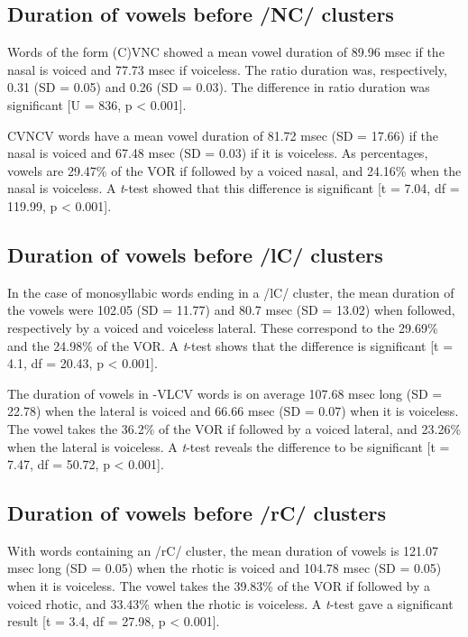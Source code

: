 \documentclass[11pt,a4paper,openany]{memoir}\usepackage[]{graphicx}\usepackage[]{color}
\begin{document}
\subsection{Duration of vowels before /NC/ clusters}


Words of the form (C)VNC showed a mean vowel duration of 89.96 msec if the nasal is voiced and 77.73 msec if voiceless.
The ratio duration was, respectively, 0.31 (SD = 0.05) and 0.26 (SD = 0.03).
The difference in ratio duration was significant [U = 836, p < 0.001].



CVNCV words have a mean vowel duration of 81.72 msec (SD = 17.66) if the nasal is voiced and 67.48 msec  (SD = 0.03) if it is voiceless.
As percentages, vowels are 29.47\% of the VOR if followed by a voiced nasal, and 24.16\% when the nasal is voiceless.
A \textit{t}-test showed that this difference is significant [t = 7.04, df = 119.99, p < 0.001].


\subsection{Duration of vowels before /lC/ clusters}


In the case of monosyllabic words ending in a /lC/ cluster, the mean duration of the vowels were 102.05 (SD = 11.77) and 80.7 msec (SD = 13.02) when followed, respectively by a voiced and voiceless lateral.
These correspond to the 29.69\% and the 24.98\% of the VOR.
A \textit{t}-test shows that the difference is significant [t = 4.1, df = 20.43, p < 0.001].




The duration of vowels in -VLCV words is on average 107.68 msec long (SD = 22.78) when the lateral is voiced and 66.66 msec (SD = 0.07) when it is voiceless.
The vowel takes the 36.2\% of the VOR if followed by a voiced lateral, and 23.26\% when the lateral is voiceless.
A \textit{t}-test reveals the difference to be significant [t = 7.47, df = 50.72, p < 0.001].

\subsection{Duration of vowels before /rC/ clusters}



With words containing an /rC/ cluster, the mean duration of vowels is 121.07 msec long (SD = 0.05) when the rhotic is voiced and 104.78 msec (SD = 0.05) when it is voiceless.
The vowel takes the 39.83\% of the VOR if followed by a voiced rhotic, and 33.43\% when the rhotic is voiceless.
A \textit{t}-test gave a significant result [t = 3.4, df = 27.98, p < 0.001].
\end{document}
